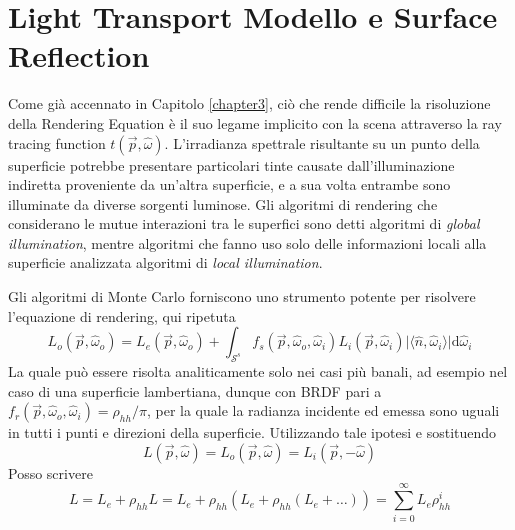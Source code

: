 \newcommand{\ptset}[1]{\ensuremath{\{\ldots,\vec{p}_{#1}\}}}
\newcommand{\codesnippet}[1]{\vspace{0.75em}\\
	$\left\langle\textit{#1}\right\rangle+\hspace{-4pt}\equiv$
	\vspace{-0.75em}
}
\newcommand{\codesnippetinl}[1]{
	$\left\langle\textit{#1}\right\rangle$
}
\chapter{Light Transport Modello e Surface Reflection}\label{chapter8}
Come gi\`a accennato in Capitolo \ref{chapter3}, ci\`o che rende difficile la risoluzione della Rendering Equation \`e il suo legame implicito con
la scena attraverso la ray tracing function $t(\vec{p}, \hat{\omega})$. L'irradianza spettrale risultante su un punto della superficie potrebbe 
presentare particolari tinte causate dall'illuminazione indiretta proveniente da un'altra superficie, e a sua volta entrambe sono illuminate da 
diverse sorgenti luminose. Gli algoritmi di rendering che considerano le mutue interazioni tra le superfici sono detti algoritmi di 
\textit{global illumination}, mentre algoritmi che fanno uso solo delle informazioni locali alla superficie analizzata algoritmi di 
\textit{local illumination}.\par
Gli algoritmi di Monte Carlo forniscono uno strumento potente per risolvere l'equazione di rendering, qui ripetuta
\begin{equation*}
	L_o(\vec{p},\hat{\omega}_o)=L_e(\vec{p},\hat{\omega}_o)+\int_{\mathcal{S}^s}f_s(\vec{p},\hat{\omega}_o,\hat{\omega}_i)L_i(\vec{p},\hat{\omega}_i)%
		\vert\langle\hat{n},\hat{\omega}_i\rangle\vert\mathrm{d}\hat{\omega}_i
\end{equation*}
La quale pu\`o essere risolta analiticamente solo nei casi pi\`u banali, ad esempio nel caso di una superficie lambertiana, dunque con BRDF pari a 
\mbox{$f_r(\vec{p},\hat{\omega}_o,\hat{\omega}_i)=\rho_{hh}/\pi$}, per la quale la radianza 
incidente ed emessa sono uguali in tutti i punti e direzioni della superficie. Utilizzando tale ipotesi e sostituendo 
\begin{equation*}
	L(\vec{p},\hat{\omega})=L_o(\vec{p},\hat{\omega})=L_i(\vec{p},-\hat{\omega})
\end{equation*}
Posso scrivere
\begin{equation}
	L=L_e+\rho_{hh}L=L_e+\rho_{hh}(L_e+\rho_{hh}(L_e+\ldots))=\sum_{i=0}^\infty L_e\rho_{hh}^i
\end{equation}
